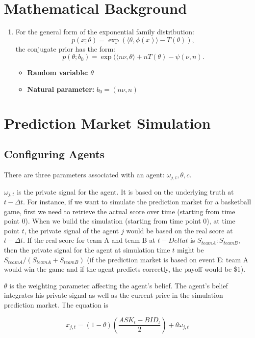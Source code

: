 \documentclass{article}
\begin{document}
\section{Mathematical Background}
\begin{enumerate}
    \item For the general form of the exponential family distribution:
    \[ p(x;\theta)=\exp\left(\langle\theta,\phi(x)\rangle-T(\theta)\right), \]
    the conjugate prior has the form:
    \[ p(\theta;b_0)=\exp(\langle n\nu,\theta\rangle+nT(\theta)-\psi(\nu,n). \]
    \begin{itemize}
        \item \textbf{Random variable:} $\theta$
        \item \textbf{Natural parameter:} $b_0=(n\nu,n)$
    \end{itemize}
\end{enumerate}

\section{Prediction Market Simulation}
\subsection{Configuring Agents}
There are three parameters associated with an agent: $\omega_{j,t},\theta,c$.

$\omega_{j,t}$ is the private signal for the agent. It is based on the underlying truth at $t-\Delta t$. For instance, if we want to simulate the prediction market for a basketball game, first we need to retrieve the actual score over time (starting from time point $0$). When we build the simulation (starting from time point $0$), at time point $t$, the private signal of the agent $j$ would be based on the real score at $t-\Delta t$. If the real score for team A and team B at $t-Delta t$ is $S_{team A}:S_{team B}$, then the private signal for the agent at simulation time $t$ might be $S_{team A}/(S_{team A}+S_{team B})$ (if the prediction market is based on event E: team A would win the game and if the agent predicts correctly, the payoff would be \$1).

$\theta$ is the weighting parameter affecting the agent's belief. The agent's belief integrates his private signal as well as the current price in the simulation prediction market. The equation is

\begin{equation}
	x_{j,t}=(1-\theta)\left(\frac{ASK_t-BID_t}{2}\right)+\theta\omega_{j,t}
\end{equation}
\end{document}
